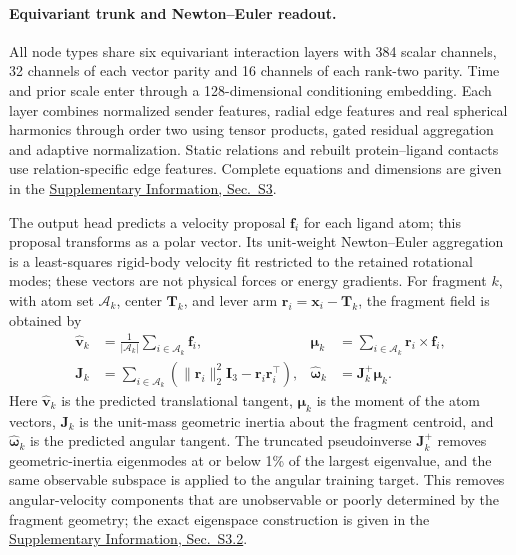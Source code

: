 \documentclass{article}
\renewcommand{\boldsymbol}[1]{\pmb{#1}}
\newcommand{\sisection}[1]{\href{SI.pdf}{Supplementary Information, Sec.~#1}}
\begin{document}
\paragraph{Equivariant trunk and Newton--Euler readout.}
\label{sec:equivariant_network}
\label{sec:newton_euler}

All node types share six equivariant interaction layers with 384 scalar channels, 32 channels of each vector parity and 16 channels of each rank-two parity. Time and prior scale enter through a 128-dimensional conditioning embedding. Each layer combines normalized sender features, radial edge features and real spherical harmonics through order two using tensor products, gated residual aggregation and adaptive normalization. Static relations and rebuilt protein--ligand contacts use relation-specific edge features. Complete equations and dimensions are given in the \sisection{S3}.

The output head predicts a velocity proposal \(\mathbf{f}_i\) for each ligand atom; this proposal transforms as a polar vector. Its unit-weight Newton--Euler aggregation is a least-squares rigid-body velocity fit restricted to the retained rotational modes; these vectors are not physical forces or energy gradients.
For fragment \(k\), with atom set \(\mathcal{A}_k\), center \(\mathbf{T}_k\), and lever arm \(\mathbf{r}_i=\mathbf{x}_i-\mathbf{T}_k\), the fragment field is obtained by
\begin{align}
    \widehat{\mathbf{v}}_k
    &=
    \frac{1}{|\mathcal{A}_k|}
    \sum_{i\in\mathcal{A}_k}\mathbf{f}_i,
    &
    \boldsymbol{\mu}_k
    &=
    \sum_{i\in\mathcal{A}_k}\mathbf{r}_i\times\mathbf{f}_i,
    \nonumber\\
    \mathbf{J}_k
    &=
    \sum_{i\in\mathcal{A}_k}
    \left(
      \|\mathbf{r}_i\|_2^2\mathbf{I}_3
      -\mathbf{r}_i\mathbf{r}_i^{\top}
    \right),
    &
    \widehat{\boldsymbol{\omega}}_k
    &=\mathbf{J}_k^{+}\boldsymbol{\mu}_k.
    \label{eq:newton_euler}
\end{align}
Here \(\widehat{\mathbf{v}}_k\) is the predicted translational tangent, \(\boldsymbol{\mu}_k\) is the moment of the atom vectors, \(\mathbf{J}_k\) is the unit-mass geometric inertia about the fragment centroid, and \(\widehat{\boldsymbol{\omega}}_k\) is the predicted angular tangent.
The truncated pseudoinverse \(\mathbf{J}_k^+\) removes geometric-inertia eigenmodes at or below 1\% of the largest eigenvalue, and the same observable subspace is applied to the angular training target.
This removes angular-velocity components that are unobservable or poorly determined by the fragment geometry; the exact eigenspace construction is given in the \sisection{S3.2}.
\end{document}
